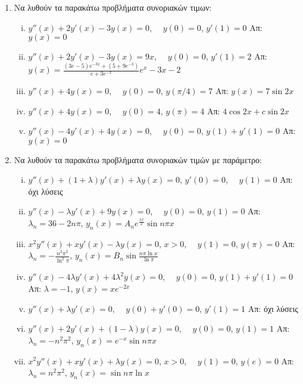 


\pagestyle{askhseis}




\begin{center}
\minibox{\large \bfseries \textcolor{Col1}{Προβλήματα Sturm-Liouville}}
\end{center}

\vspace{\baselineskip}


\begin{enumerate}
\item Να λυθούν τα παρακάτω προβλήματα συνοριακών τιμων:
  \begin{enumerate}[i)]
    \item $y''(x)+2y'(x)-3y(x)=0$, $\quad y(0)=0$, $y'(1)=0$ \hfill Απ: $y(x)=0$
    \item $y''(x)+2y'(x)-3y(x)=9x$, $\quad y(0)=0$, $y'(1)=2$ 
      \hfill Απ: $\scriptstyle{y(x)=\frac{(3e-5)e^{-3x}+(5+9e^{-3})}
      {e+3e^{-x}}e^{x}-3x-2}$
    \item $y''(x)+4y(x)=0$, $\quad y(0)=0$, $y(\pi/4)=7$ 
      \hfill Απ: $y(x)=7\sin 2x$
    \item $y''(x)+4y(x)=0$, $\quad y(0)=4$, $y(\pi)=4$ \hfill Απ: $4\cos 2x+c\sin 2x$
    \item $y''(x)-4y'(x)+4y(x)=0$, $\quad y(0)=0$, $y(1)+y'(1)=0$ \hfill Απ: $y(x)=0$
  \end{enumerate}

\item Να λυθούν τα παρακάτω προβλήματα συνοριακών τιμών με παράμετρο:
  \begin{enumerate}[i)]
    \item $y''(x)+(1+\lambda)y'(x)+\lambda y(x)=0$, $y'(0)=0$, $\quad y(1)=0$ 
      \hfill Απ: όχι λύσεις
    \item $y''(x)-\lambda y'(x)+9y(x)=0$, $\quad y(0)=0$, $y(1)=0$
      \hfill Απ: $\scriptstyle{\lambda_{n}=36-2n\pi}$, 
      $\scriptstyle{y_{n}(x)=A_{n}e^{\frac{\lambda x}{2}}\sin n\pi x}$
    \item $x^{2}y''(x)+xy'(x)-\lambda y(x)=0$, $x>0$, $\quad y(1)=0$, $y(\pi)=0$
      \hfill Απ: $\scriptstyle{\lambda_{n}=-\frac{n^{2}\pi^{2}}{\ln^{2}\pi}}$, 
      $\scriptstyle{y_{n}(x)=B_{n}\sin \frac{n\pi \ln x}{\ln \pi}}$
    \item $y''(x)-4\lambda y'(x)+4\lambda^{2}y(x)=0$, $\quad y(0)=0$, $y(1)+y'(1)=0$
      \hfill Απ: $\lambda=-1$, $y(x)=xe^{-2x}$
    \item $y''(x)+\lambda y'(x)=0$, $\quad y(0)+y'(0)=0$, $y'(1)=1$ 
      \hfill Απ: όχι λύσεις
    \item $y''(x)+2y'(x)+(1-\lambda)y(x)=0$, $\quad y(0)=0$, $y(1)=1$
      \hfill Απ: $\scriptstyle{\lambda_{n}=-n^{2}\pi^{2}}$, 
      $\scriptstyle{y_{n}(x)=e^{-x}\sin n\pi x}$
    \item $x^{2}y''(x)+x y'(x)+\lambda y(x)=0$, $x>0$, $\quad y(1)=0$, $y(e)=0$
      \hfill Απ: $\scriptstyle{\lambda_{n}=n^{2}\pi^{2}}$, 
      $\scriptstyle{y_{n}(x)=\sin n\pi\ln x}$
  \end{enumerate}
\end{enumerate}


